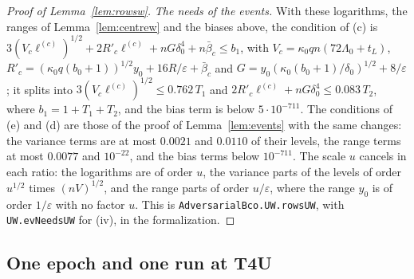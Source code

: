 \documentclass[11pt]{amsart}
\theoremstyle{definition}
\numberwithin{equation}{section}
\begin{document}
\begin{proof}[Proof of Lemma~\ref{lem:rowsw}]
\emph{The needs of the events.} With these logarithms, the ranges of Lemma~\ref{lem:centrew} and the biases above, the condition of (c) is $3(V_c\ell^{(c)})^{1/2}+2R'_c\ell^{(c)}+nG\delta_0^4+n\bar\beta_c\le b_1$, with $V_c=\kappa_0qn(72\Lambda_0+t_L)$, $R'_c=(\kappa_0q(b_0+1))^{1/2}y_0+16R/\varepsilon+\bar\beta_c$ and $G=y_0(\kappa_0(b_0+1)/\delta_0)^{1/2}+8/\varepsilon$; it splits into $3(V_c\ell^{(c)})^{1/2}\le0.762\,T_1$ and $2R'_c\ell^{(c)}+nG\delta_0^4\le0.083\,T_2$, where $b_1=1+T_1+T_2$, and the bias term is below $5\cdot10^{-711}$. The conditions of (e) and (d) are those of the proof of Lemma~\ref{lem:events} with the same changes: the variance terms are at most $0.0021$ and $0.0110$ of their levels, the range terms at most $0.0077$ and $10^{-22}$, and the bias terms below $10^{-711}$. The scale $u$ cancels in each ratio: the logarithms are of order $u$, the variance parts of the levels of order $u^{1/2}$ times $(nV)^{1/2}$, and the range parts of order $u/\varepsilon$, where the range $y_0$ is of order $1/\varepsilon$ with no factor $u$. This is \texttt{AdversarialBco.\allowbreak UW.\allowbreak rowsUW}, with \texttt{UW.\allowbreak evNeedsUW} for (iv), in the formalization.
\end{proof}

\subsection*{One epoch and one run at T4U}
\end{document}
